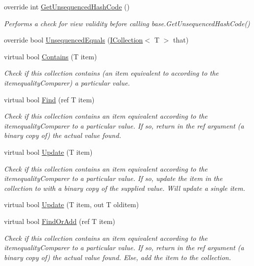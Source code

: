 \begin{DoxyCompactItemize}
override int \hyperlink{class_c5_1_1_linked_list_a66dd343eb1edfd17074b200fccd59621}{Get\+Unsequenced\+Hash\+Code} ()
\begin{DoxyCompactList}\small\item\em Performs a check for view validity before calling base.\+Get\+Unsequenced\+Hash\+Code() \end{DoxyCompactList}\item 
override bool \hyperlink{class_c5_1_1_linked_list_a5395d073fc0753d8842d805e28bda799}{Unsequenced\+Equals} (\hyperlink{interface_c5_1_1_i_collection}{I\+Collection}$<$ T $>$ that)
\item 
virtual bool \hyperlink{class_c5_1_1_linked_list_a9d3273641ee62248a93ed0eb58bed66a}{Contains} (T item)
\begin{DoxyCompactList}\small\item\em Check if this collection contains (an item equivalent to according to the itemequality\+Comparer) a particular value. \end{DoxyCompactList}\item 
virtual bool \hyperlink{class_c5_1_1_linked_list_a04291749c18af8f2f9e9f943f7ccc91d}{Find} (ref T item)
\begin{DoxyCompactList}\small\item\em Check if this collection contains an item equivalent according to the itemequality\+Comparer to a particular value. If so, return in the ref argument (a binary copy of) the actual value found. \end{DoxyCompactList}\item 
virtual bool \hyperlink{class_c5_1_1_linked_list_aeb542c2f2a82a130102b28cfb3dbfb87}{Update} (T item)
\begin{DoxyCompactList}\small\item\em Check if this collection contains an item equivalent according to the itemequality\+Comparer to a particular value. If so, update the item in the collection to with a binary copy of the supplied value. Will update a single item. \end{DoxyCompactList}\item 
virtual bool \hyperlink{class_c5_1_1_linked_list_a51e79bb8c192cabe9534d8c8665cb8e3}{Update} (T item, out T olditem)
\item 
virtual bool \hyperlink{class_c5_1_1_linked_list_ae6d34353ca7075c45dbac47a8d79dceb}{Find\+Or\+Add} (ref T item)
\begin{DoxyCompactList}\small\item\em Check if this collection contains an item equivalent according to the itemequality\+Comparer to a particular value. If so, return in the ref argument (a binary copy of) the actual value found. Else, add the item to the collection. \end{DoxyCompactList}\item 

\end{DoxyCompactItemize}
